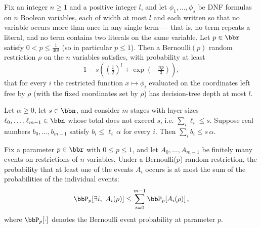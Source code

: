 \begin{theorem}
\label{LMN.subsequent_step_dtDepth}
\leanok
{}
Fix an integer $n \ge 1$ and a positive integer $l$, and let $\phi_1, \dots, \phi_s$ be
DNF formulas on $n$ Boolean variables, each of width at most $l$ and each written so
that no variable occurs more than once in any single term — that is, no term repeats a
literal, and no term contains two literals on the same variable. Let $p \in \bbr$
satisfy $0 < p \le \tfrac{1}{40 l}$ (so in particular $p \le 1$). Then a Bernoulli$(p)$
random restriction $\rho$ on the $n$ variables satisfies, with probability at least
\[
  1 - s\left(\left(\tfrac{1}{2}\right)^{l} + \exp\!\left(-\tfrac{np}{3}\right)\right),
\]
that for every $i$ the restricted function $x \mapsto \phi_i$ evaluated on the
coordinates left free by $\rho$ (with the fixed coordinates set by $\rho$) has
decision-tree depth at most $l$.
\end{theorem}

\begin{theorem}
\label{LMN.multi_stage_failure_bound}
\leanok
{}
Let $\alpha \ge 0$, let $s \in \bbn$, and consider $m$ stages with layer sizes $\ell_0,
\ldots, \ell_{m-1} \in \bbn$ whose total does not exceed $s$, i.e. $\sum_{i} \ell_i \le
s$. Suppose real numbers $b_0, \ldots, b_{m-1}$ satisfy $b_i \le \ell_i\,\alpha$ for
every $i$. Then $\sum_{i} b_i \le s\,\alpha$.
\end{theorem}

\begin{theorem}
\label{LMN.bernoulliRestrProb_union_bound_fin}
\leanok
{}
Fix a parameter $p \in \bbr$ with $0 \le p \le 1$, and let $A_0, \dots, A_{m-1}$ be
finitely many events on restrictions of $n$ variables. Under a Bernoulli($p$) random
restriction, the probability that at least one of the events $A_i$ occurs is at most the
sum of the probabilities of the individual events:
\[
\bbP_p\!\left[\exists i,\ A_i(\rho)\right] \le \sum_{i=0}^{m-1}
\bbP_p\!\left[A_i(\rho)\right],
\]
where $\bbP_p[\cdot]$ denotes the Bernoulli event probability at parameter $p$.
\end{theorem}

